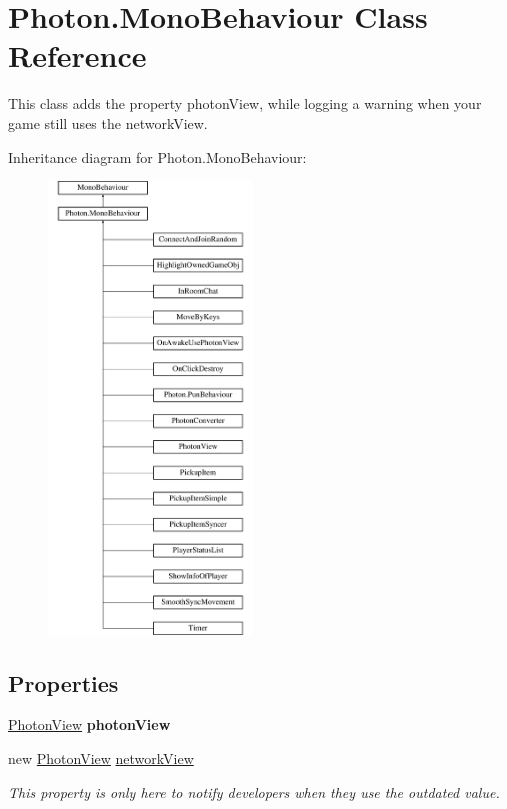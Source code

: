 \hypertarget{class_photon_1_1_mono_behaviour}{}\section{Photon.\+Mono\+Behaviour Class Reference}
\label{class_photon_1_1_mono_behaviour}


This class adds the property photon\+View, while logging a warning when your game still uses the network\+View.  


Inheritance diagram for Photon.\+Mono\+Behaviour\+:\begin{figure}[H]
\begin{center}
\leavevmode
\includegraphics[height=12.000000cm]{class_photon_1_1_mono_behaviour}
\end{center}
\end{figure}
\subsection*{Properties}
\begin{DoxyCompactItemize}
\item 
\hyperlink{class_photon_view}{Photon\+View} {\bfseries photon\+View}\hypertarget{class_photon_1_1_mono_behaviour_a27027ef7d8204896cb9381a200953892}{}\label{class_photon_1_1_mono_behaviour_a27027ef7d8204896cb9381a200953892}

\item 
new \hyperlink{class_photon_view}{Photon\+View} \hyperlink{class_photon_1_1_mono_behaviour_a00c97185c3a8594bf5c1c518a701706e}{network\+View}
\begin{DoxyCompactList}\small\item\em This property is only here to notify developers when they use the outdated value. \end{DoxyCompactList}\end{DoxyCompactItemize}


